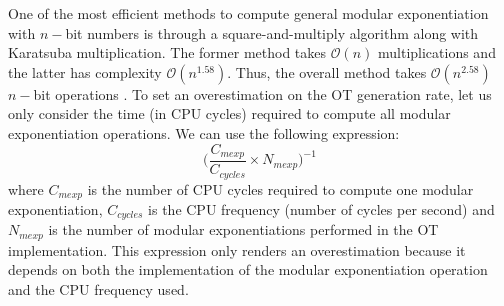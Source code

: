 

One of the most efficient methods to compute general modular exponentiation with $n-$bit numbers is through a square-and-multiply algorithm along with Karatsuba multiplication. The former method takes $\mathcal{O}(n)$ multiplications and the latter has complexity $\mathcal{O}(n^{1.58})$. Thus, the overall method takes $\mathcal{O}(n^{2.58})$ $n-$bit operations \cite{MVV01}. To set an overestimation on the OT generation rate, let us only consider the time (in CPU cycles) required to compute all modular exponentiation operations. We can use the following expression:
\begin{equation}
\label{eq:nOTs}
\Big( \frac{C_{mexp}}{C_{cycles}} \times N_{mexp} \Big)^{-1}
\end{equation}
where $C_{mexp}$ is the number of CPU cycles required to compute one modular exponentiation, $C_{cycles}$ is the CPU frequency (number of cycles per second) and $N_{mexp}$ is the number of modular exponentiations performed in the OT implementation. This expression only renders an overestimation because it depends on both the implementation of the modular exponentiation operation and the CPU frequency used. 





